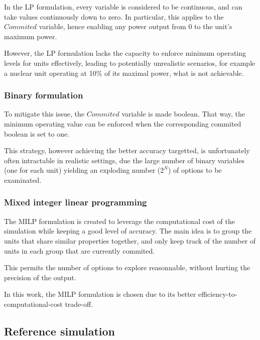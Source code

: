 In the LP formulation, every variable is considered to be continuous, and can take values continuously down to zero. In particular, this applies to the $Commited$ variable, hence enabling any power output from 0 to the unit's maximum power.

However, the LP formulation lacks the capacity to enforce minimum operating levels for units effectively, leading to potentially unrealistic scenarios, for example a nuclear unit operating at 10\% of its maximal power, what is not achievable.

\subsubsection{Binary formulation}

To mitigate this issue, the $Commited$ variable is made boolean. That way, the minimum operating value can be enforced when the corresponding commited boolean is set to one.

This strategy, however achieving the better accuracy targetted, is unfortunately often intractable in realistic settings, due the large number of binary variables (one for each unit) yielding an exploding number ($2^N$) of options to be examinated.

\subsubsection{Mixed integer linear programming \label{subsubsection:milp}}

The MILP formulation is created to leverage the computational cost of the simulation while keeping a good level of accuracy. The main idea is to group the units that share similar properties together, and only keep track of the number of units in each group that are currently commited.

This permits the number of options to explore reasonnable, without hurting the precision of the output.

In this work, the MILP formulation is chosen due to its better efficiency-to-computational-cost trade-off.

\subsection{Reference simulation \label{section:reference-simulation}}

